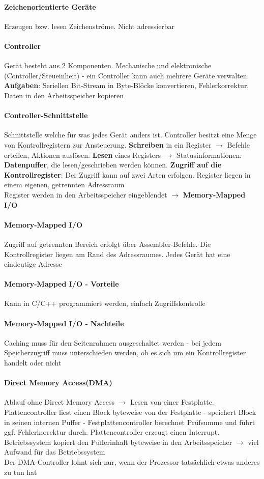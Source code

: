 \documentclass[11pt,a4paper,landscape]{article}
\begin{document}
\begin{multicols*}{3}
	\paragraph{Zeichenorientierte Geräte} Erzeugen bzw. lesen Zeichenströme. Nicht adressierbar
	\paragraph{Controller} Gerät besteht aus 2 Komponenten. Mechanische und elektronische (Controller/Steueinheit) - ein Controller kann auch mehrere Geräte verwalten. \textbf{Aufgaben}: Seriellen Bit-Stream in Byte-Blöcke konvertieren, Fehlerkorrektur, Daten in den Arbeitsspeicher kopieren
	\paragraph{Controller-Schnittstelle} Schnittstelle welche für was jedes Gerät anders ist. Controller besitzt eine Menge von Kontrollregistern zur Ansteuerung. \textbf{Schreiben} in ein Register $\rightarrow$ Befehle erteilen, Aktionen auslösen. \textbf{Lesen} eines Registers $\rightarrow$ Statusinformationen. \textbf{Datenpuffer}, die lesen/geschrieben werden können. \textbf{Zugriff auf die Kontrollregister}: Der Zugriff kann auf zwei Arten erfolgen. Register liegen in einem eigenen, getrennten Adressraum\\
	Register werden in den Arbeitsspeicher eingeblendet $\rightarrow$ \textbf{Memory-Mapped I/O}
	\paragraph{Memory-Mapped I/O} Zugriff auf getrennten Bereich erfolgt über Assembler-Befehle. Die Kontrollregister liegen am Rand des Adressraumes. Jedes Gerät hat eine eindeutige Adresse
	\paragraph{Memory-Mapped I/O - Vorteile} Kann in C/C++ programmiert werden, einfach Zugriffskontrolle
	\paragraph{Memory-Mapped I/O - Nachteile} Caching muss für den Seitenrahmen ausgeschaltet werden - bei jedem Speicherzugriff muss unterschieden werden, ob es sich um ein Kontrollregister handelt oder nicht
	\paragraph{Direct Memory Access(DMA)} Ablauf ohne Direct Memory Access $\rightarrow$ Lesen von einer Festplatte. Plattencontroller liest einen Block byteweise von der Festplatte - speichert Block in seinen internen Puffer - Festplattencontroller berechnet Prüfsumme und führt ggf. Fehlerkorrektur durch. Plattencontroller erzeugt einen Interrupt. Betriebssystem kopiert den Pufferinhalt byteweise in den Arbeitsspeicher $\rightarrow$ viel Aufwand für das Betriebssystem\\
	Der DMA-Controller lohnt sich nur, wenn der Prozessor tatsächlich etwas anderes zu tun hat

\end{multicols*}
\end{document}
